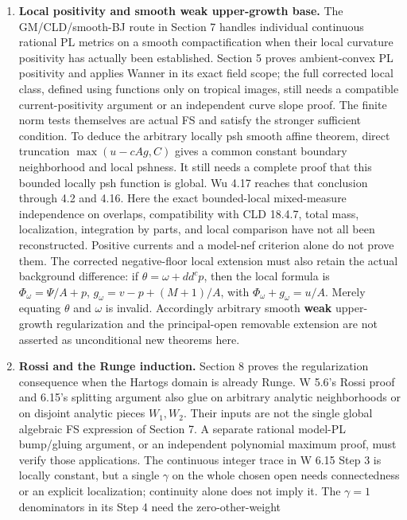 \documentclass[
  10pt,
]{article}
\begin{document}
\begin{enumerate}
\def\labelenumi{\arabic{enumi}.}
\item
  \textbf{Local positivity and smooth weak upper-growth base.} The
  GM/CLD/smooth-BJ route in Section 7 handles individual continuous
  rational PL metrics on a smooth compactification when their local
  curvature positivity has actually been established. Section 5 proves
  ambient-convex PL positivity and applies Wanner in its exact field
  scope; the full corrected local class, defined using functions only on
  tropical images, still needs a compatible current-positivity argument
  or an independent curve slope proof. The finite norm tests themselves
  are actual FS and satisfy the stronger sufficient condition. To deduce
  the arbitrary locally psh smooth affine theorem, direct truncation
  \(\max(u-cAg,C)\) gives a common constant boundary neighborhood and
  local pshness. It still needs a complete proof that this bounded
  locally psh function is global. Wu 4.17 reaches that conclusion
  through 4.2 and 4.16. Here the exact bounded-local mixed-measure
  independence on overlaps, compatibility with CLD 18.4.7, total mass,
  localization, integration by parts, and local comparison have not all
  been reconstructed. Positive currents and a model-nef criterion alone
  do not prove them. The corrected negative-floor local extension must
  also retain the actual background difference: if
  \(\theta=\omega+dd^cp\), then the local formula is
  \(\Phi_\omega=\Psi/A+p\), \(g_\omega=v-p+(M+1)/A\), with
  \(\Phi_\omega+g_\omega=u/A\). Merely equating \(\theta\) and
  \(\omega\) is invalid. Accordingly arbitrary smooth \textbf{weak}
  upper-growth regularization and the principal-open removable extension
  are not asserted as unconditional new theorems here.
\item
  \textbf{Rossi and the Runge induction.} Section 8 proves the
  regularization consequence when the Hartogs domain is already Runge. W
  5.6's Rossi proof and 6.15's splitting argument also glue on arbitrary
  analytic neighborhoods or on disjoint analytic pieces \(W_1,W_2\).
  Their inputs are not the single global algebraic FS expression of
  Section 7. A separate rational model-PL bump/gluing argument, or an
  independent polynomial maximum proof, must verify those applications.
  The continuous integer trace in W 6.15 Step 3 is locally constant, but
  a single \(\gamma\) on the whole chosen open needs connectedness or an
  explicit localization; continuity alone does not imply it. The
  \(\gamma=1\) denominators in its Step 4 need the zero-other-weight

\end{enumerate}
\end{document}
